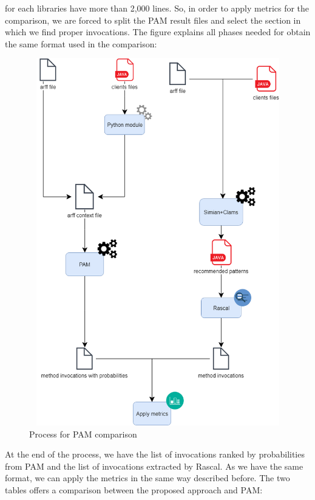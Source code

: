 for each libraries have more than 2,000 lines. So, in order to apply metrics for the comparison, we are forced to split the PAM result files and select the section in which we find proper invocations. The figure explains all phases needed for obtain the same format used in the comparison:
 

\begin{figure}[H]
\includegraphics[width=16cm,height=16cm,keepaspectratio]{images/PAM.png}
\centering
  \caption{Process for PAM comparison}
  \label{fig:cmd}
\end{figure}
 At the end of the process, we have the list of invocations ranked by probabilities from PAM and the list of invocations extracted by Rascal. As we have the same format, we can apply the metrics in the same way described before. The two tables offers a comparison between the proposed approach and PAM: 

